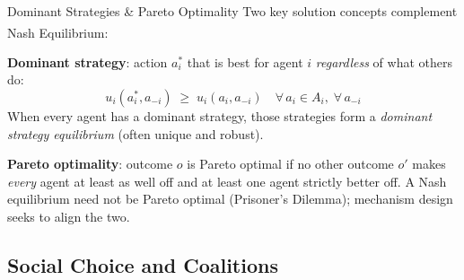\begin{v3topic}{Dominant Strategies \& Pareto Optimality}
    Two key solution concepts complement Nash Equilibrium:\textsuperscript{\cite[][p.~64]{shohamMultiagentSystemsAlgorithmic2009}}

    \textbf{Dominant strategy}: action $a_i^*$ that is best for agent $i$ \emph{regardless}
    of what others do:
    \begin{equation}
        u_i(a_i^*, a_{-i}) \;\geq\; u_i(a_i, a_{-i})
        \quad \forall\, a_i \in A_i,\; \forall\, a_{-i}
    \end{equation}
    When every agent has a dominant strategy, those strategies form a
    \emph{dominant strategy equilibrium} (often unique and robust).

    \textbf{Pareto optimality}: outcome $o$ is Pareto optimal if no other outcome
    $o'$ makes \emph{every} agent at least as well off and at least one agent
    strictly better off.
    A Nash equilibrium need not be Pareto optimal (Prisoner's Dilemma);
    mechanism design seeks to align the two.

\end{v3topic}

\subsection{Social Choice and Coalitions}

